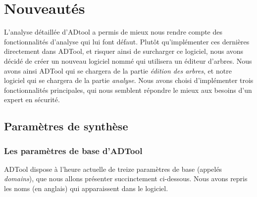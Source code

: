 \section{Nouveautés}
	L'analyse détaillée d'ADtool a permis de mieux nous rendre compte des fonctionnalités d'analyse qui lui font défaut. Plutôt qu'implémenter ces dernières directement dans ADTool, et risquer ainsi de surcharger %
	ce logiciel, nous avons décidé de créer un nouveau logiciel nommé \glasir qui utilisera un éditeur d'arbres. Nous avons ainsi ADTool qui se chargera de la partie \textit{édition des arbres}, et notre logiciel qui se chargera de la partie \textit{analyse}. Nous avons choisi d'implémenter trois fonctionnalités principales, qui nous semblent répondre le mieux aux besoins d'un expert en sécurité.

	\subsection{Paramètres de synthèse}
		\subsubsection{Les paramètres de base d'ADTool}
			\label{subsec::ParamBase}

			ADTool dispose à l'heure actuelle de treize paramètres de base (appelés \textit{domains}), que nous allons présenter succinctement ci-dessous. Nous avons repris les noms (en anglais) qui apparaissent dans le logiciel. 
					
